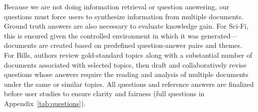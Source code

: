 Because we are not doing information retrieval or question answering,
our questions must force users to synthesize information from multiple
documents.
%
Ground truth answers are also necessary to evaluate knowledge
gain. For Sci-Fi, this is ensured given the controlled
environment in which it was generated---documents are created based on
predefined question-answer pairs and themes.
%
For Bills, authors review gold-standard topics along
with a substantial number of documents associated with selected topics, then draft and collaboratively revise questions whose
answers require the reading and analysis of multiple documents under
the same or similar topics.
%
All questions and reference answers are finalized before user studies
to ensure clarity and fairness (full questions in
Appendix~\ref{tab:questions}).

%
%
%
%
%



